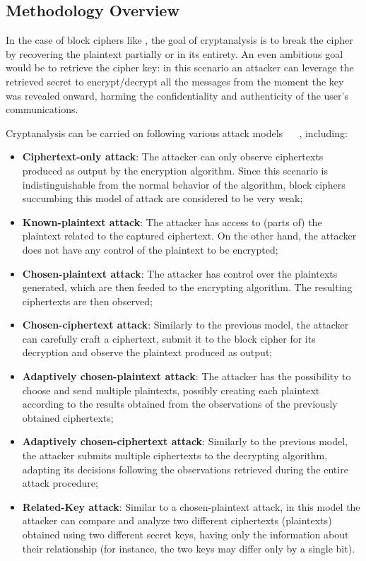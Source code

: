     \subsection{Methodology Overview}\label{subsec:meth_overview}
    In the case of block ciphers like \aes{}, the goal of cryptanalysis is to break the cipher by recovering the plaintext partially or in its entirety. An even ambitious goal would be to retrieve the cipher key: in this scenario an attacker can leverage the retrieved secret to encrypt/decrypt all the messages from the moment the key was revealed onward, harming the confidentiality and authenticity of the user's communications.

    Cryptanalysis can be carried on following various attack models ~\cite{decanniere2006cryptanalysis} ~\cite{sakiyama2016security}, including:
    \begin{itemize}
        \item \textbf{Ciphertext-only attack}: The attacker can only observe ciphertexts produced as output by the encryption algorithm. Since this scenario is indistinguishable from the normal behavior of the algorithm, block ciphers succumbing this model of attack are considered to be very weak;
        \item \textbf{Known-plaintext attack}: The attacker has access to (parts of) the plaintext related to the captured ciphertext. On the other hand, the attacker does not have any control of the plaintext to be encrypted;
        \item \textbf{Chosen-plaintext attack}: The attacker has control over the plaintexts generated, which are then feeded to the encrypting algorithm. The resulting ciphertexts are then observed;
        \item \textbf{Chosen-ciphertext attack}: Similarly to the previous model, the attacker can carefully craft a ciphertext, submit it to the block cipher for its decryption and observe the plaintext produced as output;
        \item \textbf{Adaptively chosen-plaintext attack}: The attacker has the possibility to choose and send multiple plaintexts, possibly creating each plaintext according to the results obtained from the observations of the previously obtained ciphertexts;
        \item \textbf{Adaptively chosen-ciphertext attack}: Similarly to the previous model, the attacker submits multiple ciphertexts to the decrypting algorithm, adapting its decisions following the observations retrieved during the entire attack procedure;
        \item \textbf{Related-Key attack}: Similar to a chosen-plaintext attack, in this model the attacker can compare and analyze two different ciphertexts (plaintexts) obtained using two different secret keys, having only the information about their relationship (for instance, the two keys may differ only by a single bit).
    \end{itemize}

